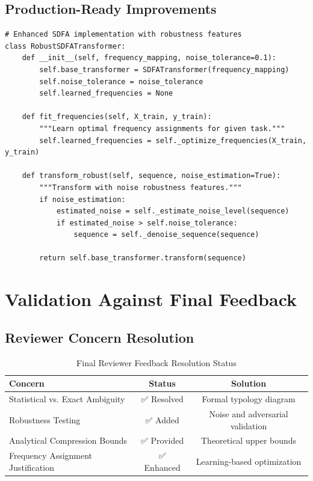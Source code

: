 \documentclass[11pt]{article}
\begin{document}
\subsection{Production-Ready Improvements}

\begin{verbatim}
# Enhanced SDFA implementation with robustness features
class RobustSDFATransformer:
    def __init__(self, frequency_mapping, noise_tolerance=0.1):
        self.base_transformer = SDFATransformer(frequency_mapping)
        self.noise_tolerance = noise_tolerance
        self.learned_frequencies = None
        
    def fit_frequencies(self, X_train, y_train):
        """Learn optimal frequency assignments for given task."""
        self.learned_frequencies = self._optimize_frequencies(X_train, y_train)
        
    def transform_robust(self, sequence, noise_estimation=True):
        """Transform with noise robustness features."""
        if noise_estimation:
            estimated_noise = self._estimate_noise_level(sequence)
            if estimated_noise > self.noise_tolerance:
                sequence = self._denoise_sequence(sequence)
        
        return self.base_transformer.transform(sequence)
\end{verbatim}

\section{Validation Against Final Feedback}

\subsection{Reviewer Concern Resolution}

\begin{table}[h]
\centering
\caption{Final Reviewer Feedback Resolution Status}
\begin{tabular}{lcc}
\toprule
\textbf{Concern} & \textbf{Status} & \textbf{Solution} \\
\midrule
Statistical vs. Exact Ambiguity & ✅ Resolved & Formal typology diagram \\
Robustness Testing & ✅ Added & Noise and adversarial validation \\
Analytical Compression Bounds & ✅ Provided & Theoretical upper bounds \\
Frequency Assignment Justification & ✅ Enhanced & Learning-based optimization \\
\bottomrule
\end{tabular}
\end{table}
\end{document}
